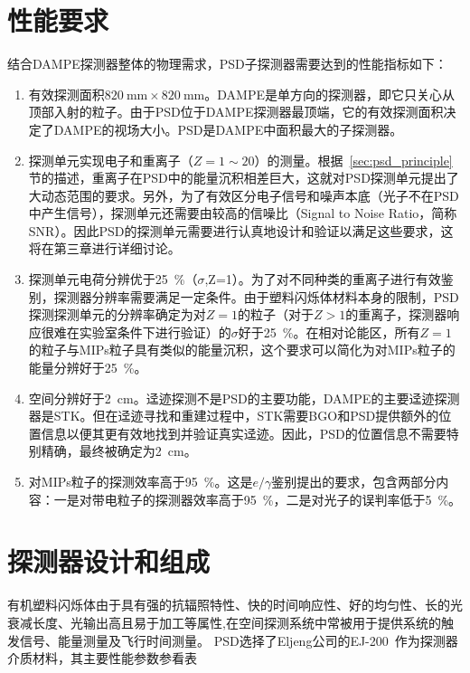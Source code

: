 \section{性能要求}
\label{sec:psd_requirements}
结合DAMPE探测器整体的物理需求，PSD子探测器需要达到的性能指标如下：
\begin{enumerate}
	\item 有效探测面积$\SI{820}{\milli\meter}\times\SI{820}{\milli\meter}$。DAMPE是单方向的探测器，即它只关心从顶部入射的粒子。由于PSD位于DAMPE探测器最顶端，它的有效探测面积决定了DAMPE的视场大小。PSD是DAMPE中面积最大的子探测器。
	\item 探测单元实现电子和重离子（$Z=1\sim20$）的测量。根据~\ref{sec:psd_principle}节的描述，重离子在PSD中的能量沉积相差巨大，这就对PSD探测单元提出了大动态范围的要求。另外，为了有效区分电子信号和噪声本底（光子不在PSD中产生信号），探测单元还需要由较高的信噪比（Signal to Noise Ratio，简称SNR）。因此PSD的探测单元需要进行认真地设计和验证以满足这些要求，这将在第三章进行详细讨论。
	\item 探测单元电荷分辨优于\SI{25}{\percent}（$\sigma$,Z=1）。为了对不同种类的重离子进行有效鉴别，探测器分辨率需要满足一定条件。由于塑料闪烁体材料本身的限制，PSD探测探测单元的分辨率确定为对$Z=1$的粒子（对于$Z>1$的重离子，探测器响应很难在实验室条件下进行验证）的$\sigma$好于\SI{25}{\percent}。在相对论能区，所有$Z=1$的粒子与MIPs粒子具有类似的能量沉积，这个要求可以简化为对MIPs粒子的能量分辨好于\SI{25}{\percent}。
	\item 空间分辨好于\SI{2}{\centi\meter}。迳迹探测不是PSD的主要功能，DAMPE的主要迳迹探测器是STK。但在迳迹寻找和重建过程中，STK需要BGO和PSD提供额外的位置信息以便其更有效地找到并验证真实迳迹。因此，PSD的位置信息不需要特别精确，最终被确定为\SI{2}{\centi\meter}。
	\item 对MIPs粒子的探测效率高于\SI{95}{\percent}。这是$e/\gamma$鉴别提出的要求，包含两部分内容：一是对带电粒子的探测器效率高于\SI{95}{\percent}，二是对光子的误判率低于\SI{5}{\percent}。
\end{enumerate}

\section{探测器设计和组成}
\label{sec:psd_composition}
有机塑料闪烁体由于具有强的抗辐照特性、快的时间响应性、好的均匀性、长的光衰减长度、光输出高且易于加工等属性,在空间探测系统中常被用于提供系统的触发信号、能量测量及飞行时间测量。
PSD选择了Eljeng公司的EJ-200~\parencite{ej-200}作为探测器介质材料，其主要性能参数参看表

